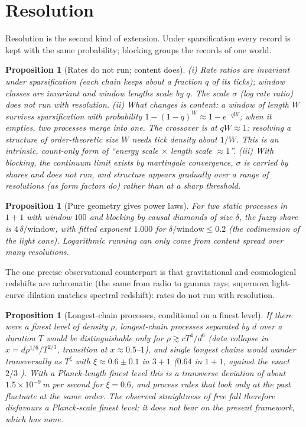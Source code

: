 \documentclass[11pt]{article}
\newtheorem{proposition}[theorem]{Proposition}
\theoremstyle{definition}
\theoremstyle{remark}
\begin{document}
\section{Resolution}\label{sec:resolution}

Resolution is the second kind of extension. Under sparsification every record is kept with the same probability; blocking groups the records of one world.

\begin{proposition}[Rates do not run; content does]
(i) Rate ratios are invariant under sparsification (each chain keeps about a fraction $q$ of its ticks); window classes are invariant and window lengths scale by $q$. The scale $\sigma$ (log rate ratio) does not run with resolution. (ii) What changes is content: a window of length $W$ survives sparsification with probability $1-(1-q)^W\approx1-e^{-qW}$; when it empties, two processes merge into one. The crossover is at $qW\approx1$: resolving a structure of order-theoretic size $W$ needs tick density about $1/W$. This is an intrinsic, count-only form of ``energy scale $\times$ length scale $\approx1$''. (iii) With blocking, the continuum limit exists by martingale convergence, $\sigma$ is carried by shares and does not run, and structure appears gradually over a range of resolutions (as form factors do) rather than at a sharp threshold.
\end{proposition}

\begin{proposition}[Pure geometry gives power laws]
For two static processes in $1+1$ with window $100$ and blocking by causal diamonds of size $\delta$, the fuzzy share is $4\,\delta/\text{window}$, with fitted exponent $1.000$ for $\delta/\text{window}\le0.2$ (the codimension of the light cone). Logarithmic running can only come from content spread over many resolutions.
\end{proposition}

The one precise observational counterpart is that gravitational and cosmological redshifts are achromatic (the same from radio to gamma rays; supernova light-curve dilation matches spectral redshift): rates do not run with resolution.

\begin{proposition}[Longest-chain processes, conditional on a finest level]
If there were a finest level of density $\rho$, longest-chain processes separated by $d$ over a duration $T$ would be distinguishable only for $\rho\gtrsim cT^4/d^6$ (data collapse in $x=d\rho^{1/6}/T^{2/3}$, transition at $x\approx0.5$--$1$), and single longest chains would wander transversally as $T^{\xi}$ with $\xi\approx0.6\pm0.1$ in $3+1$ ($0.64$ in $1+1$, against the exact $2/3$ \cite{bdj}). With a Planck-length finest level this is a transverse deviation of about $1.5\times10^{-9}$\,m per second for $\xi=0.6$, and process rules that look only at the past fluctuate at the same order. The observed straightness of free fall therefore disfavours a Planck-scale finest level; it does not bear on the present framework, which has none.
\end{proposition}
\end{document}
